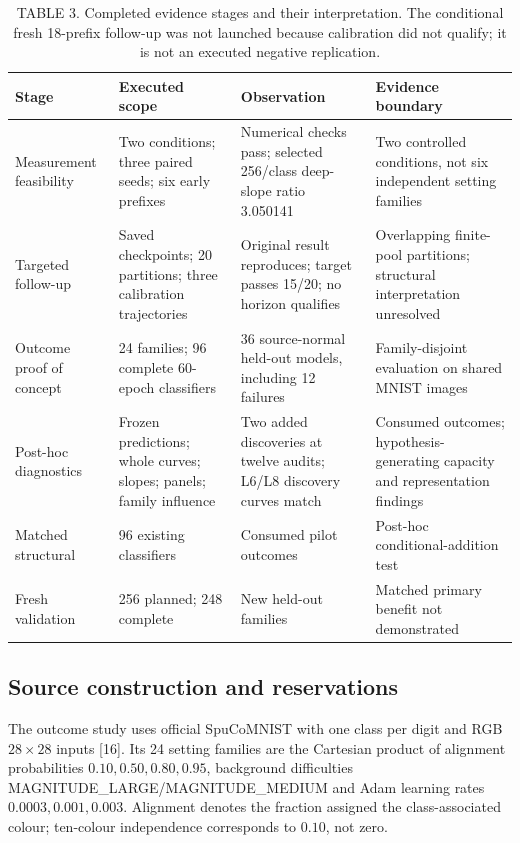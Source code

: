 \begin{table}[t]
\caption{TABLE 3. Completed evidence stages and their interpretation. The conditional fresh 18-prefix follow-up was not launched because calibration did not qualify; it is not an executed negative replication.}
\label{tab:stages}
\centering\small
\begin{tabular}{llll}
\toprule Stage & Executed scope & Observation & Evidence boundary\\\midrule
Measurement feasibility & Two conditions; three paired seeds; six early prefixes & Numerical checks pass; selected 256/class deep-slope ratio 3.050141 & Two controlled conditions, not six independent setting families\\
Targeted follow-up & Saved checkpoints; 20 partitions; three calibration trajectories & Original result reproduces; target passes 15/20; no horizon qualifies & Overlapping finite-pool partitions; structural interpretation unresolved\\
Outcome proof of concept & 24 families; 96 complete 60-epoch classifiers & 36 source-normal held-out models, including 12 failures & Family-disjoint evaluation on shared MNIST images\\
Post-hoc diagnostics & Frozen predictions; whole curves; slopes; panels; family influence & Two added discoveries at twelve audits; L6/L8 discovery curves match & Consumed outcomes; hypothesis-generating capacity and representation findings\\
Matched structural & 96 existing classifiers & Consumed pilot outcomes & Post-hoc conditional-addition test\\
Fresh validation & 256 planned; 248 complete & New held-out families & Matched primary benefit not demonstrated\\\bottomrule
\end{tabular}
\end{table}

\subsection{Source construction and reservations}
The outcome study uses official SpuCoMNIST with one class per digit and RGB $28\times28$ inputs [16]. Its 24 setting families are the Cartesian product of alignment probabilities $0.10,0.50,0.80,0.95$, background difficulties MAGNITUDE\_LARGE/MAGNITUDE\_MEDIUM and Adam learning rates $0.0003,0.001,0.003$. Alignment denotes the fraction assigned the class-associated colour; ten-colour independence corresponds to $0.10$, not zero.

